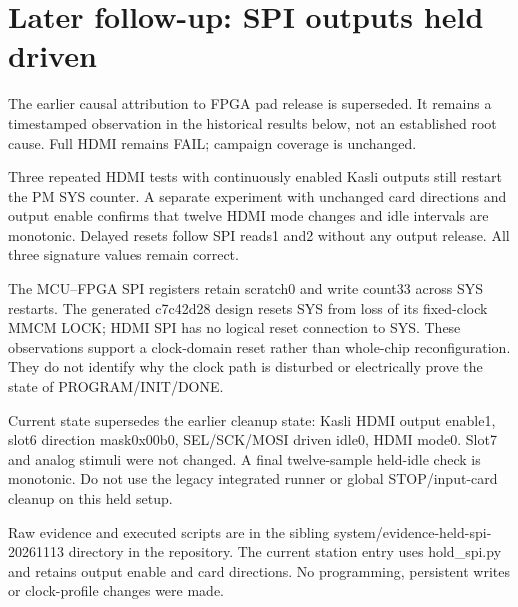 \section{Later follow-up: SPI outputs held driven}
The earlier causal attribution to FPGA pad release is superseded. It remains a timestamped observation in the historical results below, not an established root cause. Full HDMI remains FAIL; campaign coverage is unchanged.

Three repeated HDMI tests with continuously enabled Kasli outputs still restart the PM SYS counter. A separate experiment with unchanged card directions and output enable confirms that twelve HDMI mode changes and idle intervals are monotonic. Delayed resets follow SPI reads1 and2 without any output release. All three signature values remain correct.

The MCU--FPGA SPI registers retain scratch0 and write count33 across SYS restarts. The generated c7c42d28 design resets SYS from loss of its fixed-clock MMCM LOCK; HDMI SPI has no logical reset connection to SYS. These observations support a clock-domain reset rather than whole-chip reconfiguration. They do not identify why the clock path is disturbed or electrically prove the state of PROGRAM/INIT/DONE.

Current state supersedes the earlier cleanup state: Kasli HDMI output enable1, slot6 direction mask0x00b0, SEL/SCK/MOSI driven idle0, HDMI mode0. Slot7 and analog stimuli were not changed. A final twelve-sample held-idle check is monotonic. Do not use the legacy integrated runner or global STOP/input-card cleanup on this held setup.

Raw evidence and executed scripts are in the sibling system/evidence-held-spi-20261113 directory in the repository. The current station entry uses hold\_spi.py and retains output enable and card directions. No programming, persistent writes or clock-profile changes were made.
\clearpage
